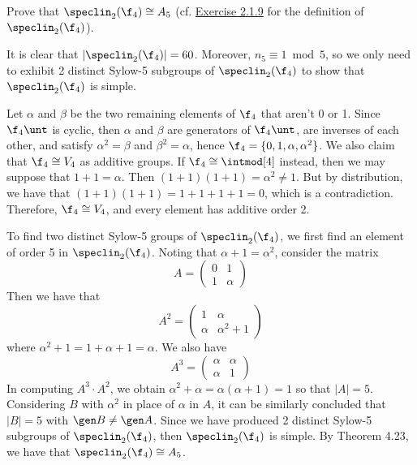 \newpage

\begin{exercise}\label{ex4.5.41}
	Prove that $\speclin_2(\f_4) \cong A_5$ (cf. \hyperref[ex2.1.9]{Exercise 2.1.9} for the definition of $\speclin_2(\f_4)$).
\end{exercise}

\begin{sol}
	It is clear that $|\speclin_2(\f_4)| = 60$. Moreover, $n_5 \equiv 1 \bmod 5$, so we only need to exhibit 2 distinct Sylow-5 subgroups of $\speclin_2(\f_4)$ to show that $\speclin_2(\f_4)$ is simple.

	Let $\alpha$ and $\beta$ be the two remaining elements of $\f_4$ that aren't 0 or 1. Since $\f_4\unt$ is cyclic, then $\alpha$ and $\beta$ are generators of $\f_4\unt$, are inverses of each other, and satisfy $\alpha^2 = \beta$ and $\beta^2 = \alpha$, hence $\f_4 = \{0, 1, \alpha, \alpha^2\}$. We also claim that $\f_4 \cong V_4$ as additive groups. If $\f_4 \cong \intmod[4]$ instead, then we may suppose that $1 + 1 = \alpha$. Then $(1 + 1)(1 + 1) = \alpha^2 \neq 1$. But by distribution, we have that $(1 + 1)(1 + 1) = 1 + 1 + 1 + 1 = 0$, which is a contradiction. Therefore, $\f_4 \cong V_4$, and every element has additive order 2.

	To find two distinct Sylow-5 groups of $\speclin_2(\f_4)$, we first find an element of order 5 in $\speclin_2(\f_4)$. Noting that $\alpha + 1 = \alpha^2$, consider the matrix
	\[A =
	\begin{pmatrix}
		0 & 1 \\
		1 & \alpha
	\end{pmatrix}
	\]
	Then we have that
	\[A^2 =
	\begin{pmatrix}
		1 & \alpha \\
		\alpha & \alpha^2 + 1
	\end{pmatrix}
	\]
	where $\alpha^2 + 1 = 1 + \alpha + 1 = \alpha$. We also have
	\[A^3 =
	\begin{pmatrix}
		\alpha & \alpha \\
		\alpha & 1
	\end{pmatrix}
	\]
	In computing $A^3 \cdot A^2$, we obtain $\alpha^2 + \alpha = \alpha(\alpha + 1) = 1$ so that $|A| = 5$. Considering $B$ with $\alpha^2$ in place of $\alpha$ in $A$, it can be similarly concluded that $|B| = 5$ with $\gen B \neq \gen A$. Since we have produced 2 distinct Sylow-5 subgroups of $\speclin_2(\f_4)$, then $\speclin_2(\f_4)$ is simple. By Theorem 4.23, we have that $\speclin_2(\f_4) \cong A_5$.
\end{sol}

